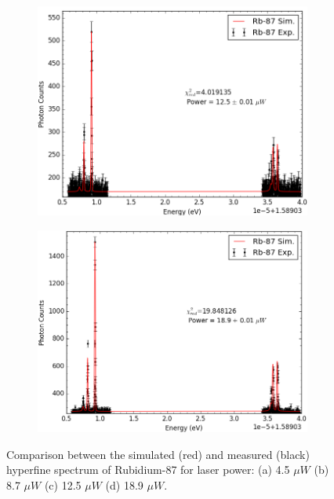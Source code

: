 \begin{figure}[h]
  	\begin{subfigure}[b]{0.49\textwidth}
        \includegraphics[width=\textwidth]{Graphics/119_120.png}
        \caption{}
    \end{subfigure}
    \begin{subfigure}[b]{0.49\textwidth}
        \includegraphics[width=\textwidth]{Graphics/096_097.png}
        \caption{}
        \label{}
    \end{subfigure}
    \caption[Comparison between the simulated and measured hyperfine spectra of Rubidium-87 for different laser powers.]{\small Comparison between the simulated (red) and measured (black) hyperfine spectrum of Rubidium-87 for laser power: (a) 4.5 $\mu W$ (b) 8.7 $\mu W$ (c) 12.5 $\mu W$ (d) 18.9 $\mu W$.}
    \label{power4-18}
\end{figure}

